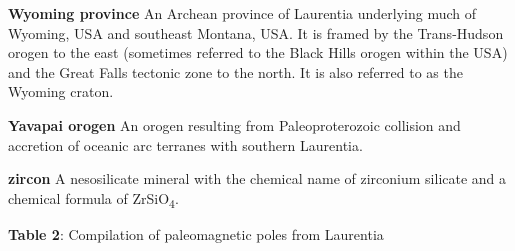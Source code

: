 \documentclass[twocolumn, switch]{article} %
\begin{document}
\noindent\textbf{Wyoming province } An Archean province of Laurentia underlying much of Wyoming, USA and southeast Montana, USA. It is framed by the Trans-Hudson orogen to the east (sometimes referred to the Black Hills orogen within the USA) and the Great Falls tectonic zone to the north. It is also referred to as the Wyoming craton.

\noindent\textbf{Yavapai orogen } An orogen resulting from Paleoproterozoic collision and accretion of oceanic arc terranes with southern Laurentia.

\noindent\textbf{zircon } A nesosilicate mineral with the chemical name of zirconium silicate and a chemical formula of ZrSiO\textsubscript{4}.


\footnotesize

\newpage

{\scriptsize
\begin{landscape}
\textbf{Table 2}: Compilation of paleomagnetic poles from Laurentia

\end{landscape}
}


\end{document}
